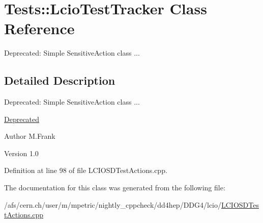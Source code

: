 \hypertarget{class_tests_1_1_lcio_test_tracker}{
\section{Tests::LcioTestTracker Class Reference}
\label{class_tests_1_1_lcio_test_tracker}
}


Deprecated: Simple SensitiveAction class ...  


\subsection{Detailed Description}
Deprecated: Simple SensitiveAction class ... \begin{Desc}
\item[\hyperlink{deprecated__deprecated000009}{Deprecated}]\end{Desc}
\begin{DoxyAuthor}{Author}
M.Frank 
\end{DoxyAuthor}
\begin{DoxyVersion}{Version}
1.0 
\end{DoxyVersion}


Definition at line 98 of file LCIOSDTestActions.cpp.

The documentation for this class was generated from the following file:\begin{DoxyCompactItemize}
\item 
/afs/cern.ch/user/m/mpetric/nightly\_\-cppcheck/dd4hep/DDG4/lcio/\hyperlink{_l_c_i_o_s_d_test_actions_8cpp}{LCIOSDTestActions.cpp}\end{DoxyCompactItemize}
